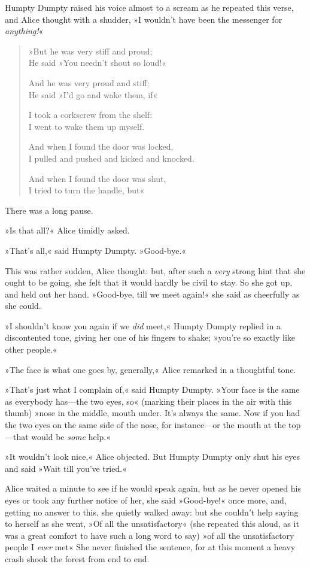 Humpty Dumpty raised his voice almost to a scream as he repeated this verse, and Alice thought with a shudder, »I wouldn't have been the messenger for \textit{anything!}«

\begin{verse}
»But he was very stiff and proud;\\
\vin He said »You needn't shout so loud!«

And he was very proud and stiff;\\
\vin He said »I'd go and wake them, if\longdash«

I took a corkscrew from the shelf:\\
\vin I went to wake them up myself.

And when I found the door was locked,\\
\vin I pulled and pushed and kicked and knocked.

And when I found the door was shut,\\
\vin I tried to turn the handle, but\longdash«
\end{verse}

There was a long pause.

»Is that all?« Alice timidly asked.

»That's all,« said Humpty Dumpty. »Good-bye.«

This was rather sudden, Alice thought: but, after such a \textit{very} strong hint that she ought to be going, she felt that it would hardly be civil to stay. So she got up, and held out her hand. »Good-bye, till we meet again!« she said as cheerfully as she could.

»I shouldn't know you again if we \textit{did} meet,« Humpty Dumpty replied in a discontented tone, giving her one of his fingers to shake; »you're so exactly like other people.«

»The face is what one goes by, generally,« Alice remarked in a thoughtful tone.

»That's just what I complain of,« said Humpty Dumpty. »Your face is the same as everybody has—the two eyes, so\longdash« (marking their places in the air with this thumb) »nose in the middle, mouth under. It's always the same. Now if you had the two eyes on the same side of the nose, for instance—or the mouth at the top—that would be \textit{some} help.«

»It wouldn't look nice,« Alice objected. But Humpty Dumpty only shut his eyes and said »Wait till you've tried.«

Alice waited a minute to see if he would speak again, but as he never opened his eyes or took any further notice of her, she said »Good-bye!« once more, and, getting no answer to this, she quietly walked away: but she couldn't help saying to herself as she went, »Of all the unsatisfactory\longdash« (she repeated this aloud, as it was a great comfort to have such a long word to say) »of all the unsatisfactory people I \textit{ever} met\longdash« She never finished the sentence, for at this moment a heavy crash shook the forest from end to end.